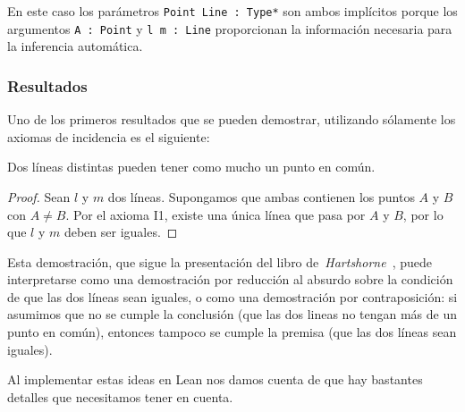 En este caso los parámetros \lstinline{Point Line : Type*} son ambos implícitos
porque los argumentos \lstinline{A : Point} y \lstinline{l m : Line}
proporcionan la información necesaria para la inferencia automática.


\subsubsection{Resultados}

Uno de los primeros resultados que se pueden demostrar, utilizando sólamente los
axiomas de incidencia es el siguiente:

\begin{prop}
	Dos líneas distintas pueden tener como mucho un punto en común.
\end{prop}

\begin{proof}
	Sean $l$ y $m$ dos líneas. Supongamos que ambas contienen los puntos $A$ y
	$B$ con $A\ne B$. Por el axioma I1, existe una única línea que pasa por $A$
	y $B$, por lo que $l$ y $m$ deben ser iguales.
\end{proof}

Esta demostración, que sigue la presentación del libro
de~\textit{Hartshorne}~\cite{hartshorneGeometryEuclid2000}, puede interpretarse
como una demostración por reducción al absurdo sobre la condición de que las dos
líneas sean iguales, o como una demostración por contraposición: si asumimos que
no se cumple la conclusión (que las dos lineas no tengan más de un punto en
común), entonces tampoco se cumple la premisa (que las dos líneas sean iguales).

Al implementar estas ideas en Lean nos damos cuenta de que hay bastantes
detalles que necesitamos tener en cuenta.


